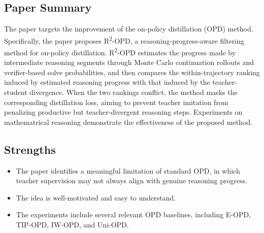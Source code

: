 \documentclass[11pt,a4paper]{article}
\begin{document}
\subsection*{Paper Summary}
The paper targets the improvement of the on-policy distillation (OPD) method. Specifically, the paper proposes R\textsuperscript{2}-OPD, a reasoning-progress-aware filtering method for on-policy distillation. R\textsuperscript{2}-OPD estimates the progress made by intermediate reasoning segments through Monte Carlo continuation rollouts and verifier-based solve probabilities, and then compares the within-trajectory ranking induced by estimated reasoning progress with that induced by the teacher-student divergence. When the two rankings conflict, the method masks the corresponding distillation loss, aiming to prevent teacher imitation from penalizing productive but teacher-divergent reasoning steps. Experiments on mathematrical reasoning demonstrate the effectiveness of the proposed method.

\subsection*{Strengths}
\begin{itemize}
\item The paper identifies a meaningful limitation of standard OPD, in which teacher supervision may not always align with genuine reasoning progress.
\item The idea is well-motivated and easy to understand.
\item The experiments include several relevant OPD baselines, including E-OPD, TIP-OPD, IW-OPD, and Uni-OPD.
\end{itemize}
\end{document}
